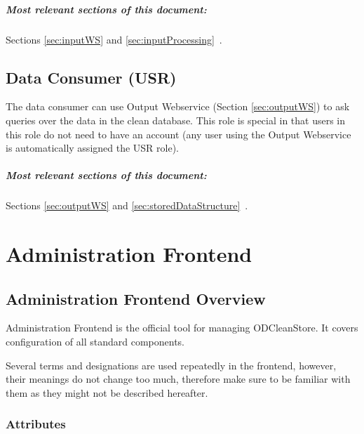   \paragraph{Most relevant sections of this document:} Sections \ref{sec:inputWS}  and \linebreak[4] \ref{sec:inputProcessing}~.

\section[Data Consumer]{Data Consumer (USR)} 
\label{sec:usr}
  The data consumer can use Output Webservice (Section \ref{sec:outputWS}) to ask queries over the data in the clean database. This role is special in that users in this role do not need to have an account (any user using the Output Webservice is automatically assigned the USR role).

  \paragraph{Most relevant sections of this document:} Sections \ref{sec:outputWS}  and \linebreak[4] \ref{sec:storedDataStructure}~.


\chapter{Administration Frontend}
\label{chap:administrationFrontend}

\section{Administration Frontend Overview}

Administration Frontend is the official tool for managing ODCleanStore. It covers configuration of all standard components.

Several terms and designations are used repeatedly in the frontend, however, their meanings do not change too much, therefore make sure to be familiar with them as they might not be described hereafter.

\subsection*{Attributes}

